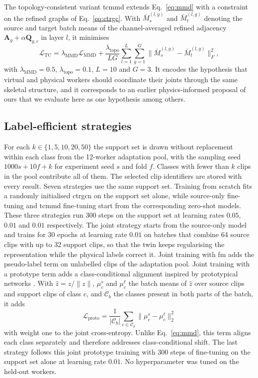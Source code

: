 \documentclass[]{interact}
\begin{document}
The topology-consistent variant \ac{tcmmd} extends Eq.~\ref{eq:mmd} with a
constraint on the refined graphs of Eq.~\ref{eq:ctrgc}. With
$\bar{M}^{(l,g)}_s$ and $\bar{M}^{(l,g)}_t$ denoting the source and target
batch means of the channel-averaged refined adjacency
$\mathbf{A}_g+\alpha\mathbf{Q}_{g,c}$ in layer $l$, it minimises
\begin{equation}
  \mathcal{L}_{\mathrm{TC}}=\lambda_{\mathrm{MMD}}\mathcal{L}_{\mathrm{MMD}}
  +\frac{\lambda_{\mathrm{topo}}}{LG}\sum_{l=1}^{L}\sum_{g=1}^{G}
  \bigl\|\bar{M}^{(l,g)}_s-\bar{M}^{(l,g)}_t\bigr\|_F^2,
  \label{eq:tc}
\end{equation}
with $\lambda_{\mathrm{MMD}}=0.5$, $\lambda_{\mathrm{topo}}=0.1$, $L=10$ and
$G=3$. It encodes the hypothesis that virtual and physical workers should
coordinate their joints through the same skeletal structure, and it corresponds
to an earlier physics-informed proposal of ours that we evaluate here as one
hypothesis among others.

\subsection{Label-efficient strategies}

For each $k\in\{1,5,10,20,50\}$ the support set is drawn without replacement
within each class from the 12-worker adaptation pool, with the sampling seed
$1000s+10f+k$ for experiment seed $s$ and fold $f$. Classes with fewer than $k$
clips in the pool contribute all of them. The selected clip identifiers are
stored with every result. Seven strategies use the same support set. Training
from scratch fits a randomly initialised \ac{ctrgcn} on the support set alone,
while source-only fine-tuning and \ac{tcmmd} fine-tuning start from the
corresponding zero-shot models. These three strategies run 300 steps on the
support set at learning rates $0.05$, $0.01$ and $0.01$ respectively. The
joint strategy starts from the source-only model and trains for 30 epochs at
learning rate $0.01$ on batches that combine 64 source clips with up to 32
support clips, so that the twin keeps regularising the representation while
the physical labels correct it. Joint training with \ac{fm} adds the
pseudo-label term on unlabelled clips of the adaptation pool. Joint training
with a prototype term adds a class-conditional alignment inspired by
prototypical networks \citep{snell2017prototypical}. With $\hat{z}=z/\|z\|$,
$\mu_c^s$ and $\mu_c^\ell$ the batch means of $\hat{z}$ over source clips and
support clips of class $c$, and $\mathcal{C}_b$ the classes present in both
parts of the batch, it adds
\begin{equation}
  \mathcal{L}_{\mathrm{proto}}=\frac{1}{|\mathcal{C}_b|}\sum_{c\in\mathcal{C}_b}
  \bigl\|\mu_c^s-\mu_c^\ell\bigr\|_2^2
  \label{eq:proto}
\end{equation}
with weight one to the joint cross-entropy. Unlike Eq.~\ref{eq:mmd}, this term
aligns each class separately and therefore addresses class-conditional shift.
The last strategy follows this joint prototype training with 300 steps of
fine-tuning on the support set alone at learning rate $0.01$. No
hyperparameter was tuned on the held-out workers.
\end{document}
